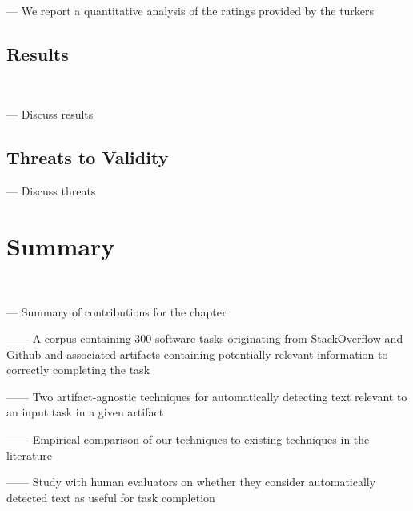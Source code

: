 --- We report a quantitative analysis of the ratings provided by the turkers




\subsection{Results}
\textcolor{white}{force ident} %

--- Discuss results \vspace{3mm}

\subsection{Threats to Validity}

--- Discuss threats \vspace{3mm}

\clearpage

\section{Summary}
\textcolor{white}{force ident} %

--- Summary of contributions for the chapter \vspace{3mm}

------ A corpus containing 300 software tasks originating from StackOverflow and Github and associated artifacts containing potentially relevant information to correctly completing the task \vspace{3mm}

------ Two artifact-agnostic techniques for automatically detecting text relevant to an input task in a given artifact

------ Empirical comparison of our techniques to existing techniques in the literature

------ Study with human evaluators on whether they consider automatically detected text as useful for task completion

